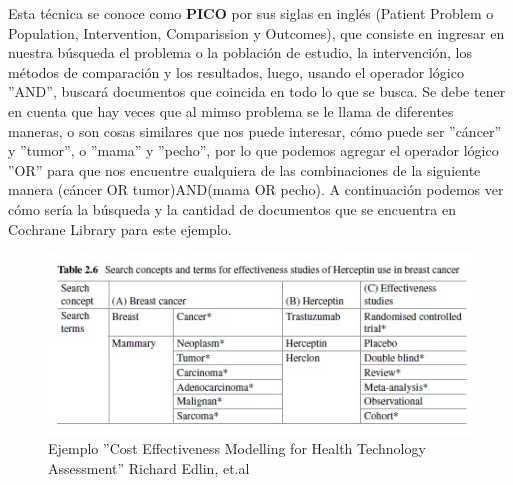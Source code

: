 \documentclass[12pt]{article}
\begin{document}
Esta técnica se conoce como \textbf{PICO} por sus siglas en inglés (Patient Problem o Population, Intervention, Comparission y Outcomes), que consiste en ingresar en nuestra búsqueda el problema o la población de estudio, la intervención, los métodos de comparación y los resultados, luego, usando el operador lógico ''AND'', buscará documentos que coincida en todo lo que se busca. Se debe tener en cuenta que hay veces que al mimso problema se le llama de diferentes maneras, o son cosas similares que nos puede interesar, cómo puede ser ''cáncer'' y ''tumor'', o ''mama'' y ''pecho'', por lo que podemos agregar el operador lógico ''OR'' para que nos encuentre cualquiera de las combinaciones de la siguiente manera (cáncer OR tumor)AND(mama OR pecho). A continuación podemos ver cómo sería la búsqueda y la cantidad de documentos que se encuentra en Cochrane Library para este ejemplo.

\begin{figure}[htbp]
    \centering
    \includegraphics[width=1\textwidth]{grafi/busqueda_cancer_mama.jpg}
    \caption{Ejemplo ''Cost Effectiveness Modelling for Health Technology Assessment'' Richard Edlin, et.al}
    \label{fig:7}
\end{figure}
\end{document}
